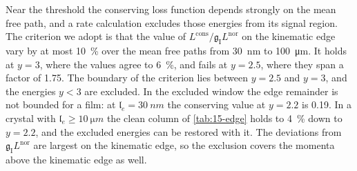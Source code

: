 Near the threshold the conserving loss function depends strongly on the mean free path, and a rate calculation excludes those energies from its signal region. The criterion we adopt is that the value of $L^{\mathrm{cons}}/\mathfrak{g}_{\mathrm{I}}L^{\mathrm{nor}}$ on the kinematic edge vary by at most \SI{10}{\percent} over the mean free paths from \SI{30}{nm} to \SI{100}{\micro m}. It holds at $y = 3$, where the values agree to \SI{6}{\percent}, and fails at $y = 2.5$, where they span a factor of 1.75. The boundary of the criterion lies between $y = 2.5$ and $y = 3$, and the energies $y < 3$ are excluded. In the excluded window the edge remainder is not bounded for a film: at $\mathfrak{l}_e = \SI{30}{nm}$ the conserving value at $y = 2.2$ is 0.19. In a crystal with $\mathfrak{l}_e \ge \SI{10}{\micro m}$ the clean column of \cref{tab:15-edge} holds to \SI{4}{\percent} down to $y = 2.2$, and the excluded energies can be restored with it. The deviations from $\mathfrak{g}_{\mathrm{I}}L^{\mathrm{nor}}$ are largest on the kinematic edge, so the exclusion covers the momenta above the kinematic edge as well.
